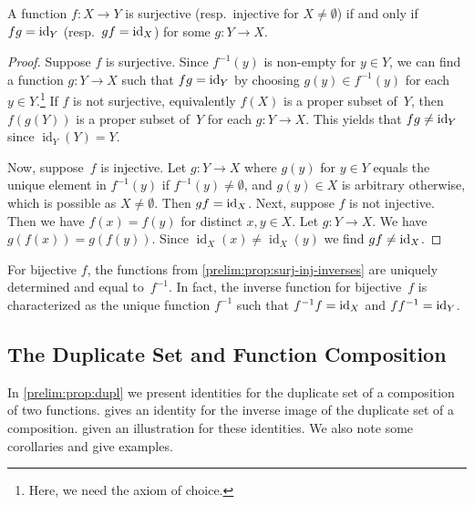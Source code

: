 \begin{proposition} \label{prelim:prop:surj-inj-inverses}
	A function $f \colon X \to Y$ is surjective (resp.~injective for $X \ne \emptyset$)
	if and only if $\concat{g}{f} = \operatorname{id}_Y$ (resp.~$\concat{f}{g} = \operatorname{id}_X$)
	for some $g \colon Y \to X$.
\end{proposition}
\begin{proof}
	Suppose $f$ is surjective.
	Since $f^{-1}(y)$ is non-empty
	for $y \in Y$,
	we can find a function $g \colon Y \to X$
	such that $\concat{g}{f} = \operatorname{id}_Y$
	by choosing $g(y) \in f^{-1}(y)$
	for each $y \in Y$.\footnote{Here, we need the axiom of choice.}
	If $f$ is not surjective, equivalently
	$f(X)$ is a proper subset of~$Y$,
	then $f(g(Y))$ is a proper subset of~$Y$
	for each $g \colon Y \to X$.
	This yields that $\concat{g}{f} \ne \operatorname{id}_Y$
	since $\operatorname{id}_Y(Y) = Y$.
	
	Now, suppose~$f$ is injective.	
	Let $g \colon Y \to X$
	where $g(y)$ for $y \in Y$ equals the unique element in $f^{-1}(y)$
	if $f^{-1}(y) \ne \emptyset$,
	and $g(y) \in X$
	is arbitrary otherwise, which is possible as $X \ne \emptyset$.
	Then $\concat{f}{g} = \operatorname{id}_X$. 
	Next, suppose $f$ is not injective.
	Then we have $f(x) = f(y)$ for distinct $x,y \in X$.
	Let $g \colon Y \to X$.
	We have $g(f(x)) = g(f(y))$.
	Since $\operatorname{id}_X(x) \ne \operatorname{id}_X(y)$
	we find $\concat{f}{g} \ne \operatorname{id}_X$.
\end{proof}

For bijective $f$, the functions from \cref{prelim:prop:surj-inj-inverses} 
are uniquely determined and equal to~$f^{-1}$.
In fact, the inverse function for bijective~$f$
is characterized as the unique function $f^{-1}$
such that $\concat{f}{f^{-1}} = \operatorname{id}_X$
and $\concat{f^{-1}}{f} = \operatorname{id}_Y$.


\subsection{The Duplicate Set and Function Composition} 
\label{prelim:sec:dupl} 

In \cref{prelim:prop:dupl} we present
identities for the duplicate set of a composition of two functions.
 gives an identity
for the inverse image of the duplicate set of a composition.
 given an illustration for these identities.
We also note some corollaries and give examples.

